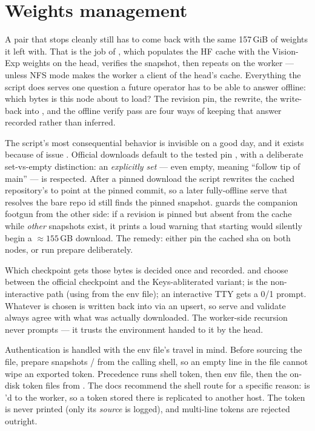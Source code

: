 \section{Weights management}
\label{sec:ops-weights}

A pair that stops cleanly still has to come back with the same 157\,GiB of
weights it left with. That is the job of
, which populates the HF cache with
the Vision-Exp weights on the head, verifies the snapshot, then repeats on
the worker --- unless NFS mode makes the worker a client of the head's cache.
Everything the script does serves one question a future operator has to be
able to answer offline: which bytes is this node about to load? The revision
pin, the  rewrite, the write-back into
, and the offline verify pass are four ways of keeping
that answer recorded rather than inferred.

The script's most consequential behavior is invisible on a good day, and it
exists because of issue . Official downloads default to the
tested pin , with a
deliberate set-vs-empty distinction: an \emph{explicitly set}
 --- even empty, meaning ``follow tip of main'' ---
is respected. After a pinned download the script rewrites the cached repository's
 to point at the pinned commit, so a later fully-offline
serve that resolves the bare repo id still finds the pinned snapshot.
 guards the companion footgun from the
other side: if a revision is pinned but absent from the cache while
\emph{other} snapshots exist, it prints a loud warning that starting would
silently begin a ${\approx}155$\,GB download. The remedy: either pin the
cached sha on both nodes, or run prepare deliberately.

Which checkpoint gets those bytes is decided once and recorded.
 and  choose between the official
checkpoint and the Keys-abliterated variant;  is the
non-interactive path (using  from the env file); an
interactive TTY gets a 0/1 prompt. Whatever is chosen is written back into
 via an upsert, so serve and validate always agree
with what was actually downloaded. The worker-side recursion never
prompts --- it trusts the environment handed to it by the head.

Authentication is handled with the env file's travel in mind. Before
sourcing the file, prepare snapshots  /
 from the calling shell, so an empty
 line in the file cannot wipe an exported token. Precedence
runs shell token, then env file, then the on-disk token files from
. The docs recommend the shell route for a
specific reason:  is 'd to the worker, so a
token stored there is replicated to another host. The token is never
printed (only its \emph{source} is logged), and multi-line tokens are
rejected outright.

